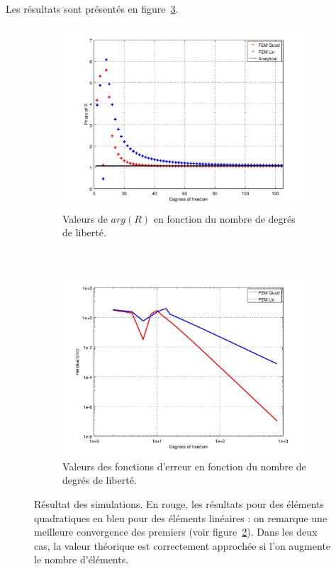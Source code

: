 Les résultats sont présentés en figure~\ref{fig:FEM1D:simuls}.

\begin{figure}[!ht]
	\centering
	\begin{subfigure}{0.48\textwidth}
		\includegraphics[width=\textwidth]{part1/figs/FEM/simuls_1D/phase.png}
		\caption{\label{fig:FEM1D:simuls:phase}Valeurs de $arg(R)$ en fonction du nombre de degrés de liberté.}
	\end{subfigure}~%
	\begin{subfigure}{0.48\textwidth}
		\includegraphics[width=\textwidth]{part1/figs/FEM/simuls_1D/convergence.png}
		\caption{\label{fig:FEM1D:simuls:convergence}Valeurs des fonctions d'erreur en fonction du nombre de degrés de liberté.}
\end{subfigure}
	\caption{\label{fig:FEM1D:simuls}Résultat des simulations. En rouge, les résultats pour des éléments quadratiques en bleu pour des éléments
	linéaires : on remarque une meilleure convergence des premiers (voir figure~\ref{fig:FEM1D:simuls:convergence}). Dans
	les deux cas, la valeur théorique est correctement approchée si l'on augmente le nombre d'éléments.}
\end{figure}

